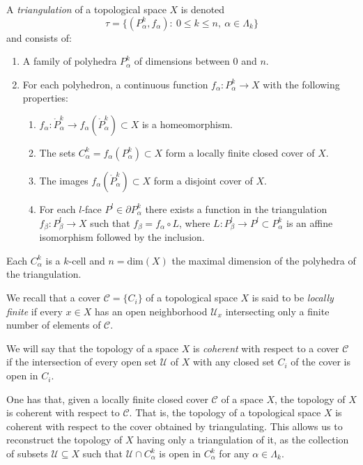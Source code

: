 \begin{definition}
    A \textit{triangulation} of a topological space $X$ is denoted
    \begin{equation*}
        \tau = \{(P^k_{\alpha}, f_{\alpha}): ~0\le k \le n, ~\alpha\in \Lambda_k\}
    \end{equation*}
    and consists of:
    \begin{enumerate}
        \item A family of polyhedra $P^k_{\alpha}$ of dimensions between $0$ and $n$.
        \item For each polyhedron, a continuous function $f_{\alpha}:P^k_{\alpha}\to X$ with the following properties:
        \begin{enumerate}
            \item $f_{\alpha}: \mathring{P}^k_{\alpha}\to f_{\alpha}(\mathring{P}^k_{\alpha})\subset X$ is a homeomorphism.
            \item The sets $C^k_{\alpha}=f_{\alpha}(P^k_{\alpha})\subset X$ form a locally finite closed cover of $X$.
            \item The images $f_{\alpha}(\mathring{P}^k_{\alpha})\subset X$ form a disjoint cover of $X$.
            \item For each $l$-face $P^l\in \partial P^k_{\alpha}$ there exists a function in the triangulation $f_{\beta}:P^l_{\beta}\to X$ such that $f_{\beta} = f_{\alpha}\circ L$, where $L: P^l_{\beta}\to P^l\subset P^k_{\alpha}$ is an affine isomorphism followed by the inclusion.
        \end{enumerate}
    \end{enumerate}
\end{definition}

\bigskip

Each $C^k_{\alpha}$ is a $k$-cell and $n=\text{dim}(X)$ the maximal dimension of the polyhedra of the triangulation.

We recall that a cover $\mathcal{C}=\{C_i\}$ of a topological space $X$ is said to be \textit{locally finite} if every $x\in X$ has an open neighborhood $\mathcal{U}_x$ intersecting only a finite number of elements of $\mathcal{C}$.

We will say that the topology of a space $X$ is \textit{coherent} with respect to a cover $\mathcal{C}$ if the intersection of every open set $\mathcal{U}$ of $X$ with any closed set $C_i$ of the cover is open in $C_i$.

One has that, given a locally finite closed cover $\mathcal{C}$ of a space $X$, the topology of $X$ is coherent with respect to $\mathcal{C}$. That is, the topology of a topological space $X$ is coherent with respect to the cover obtained by triangulating. This allows us to reconstruct the topology of $X$ having only a triangulation of it, as the collection of subsets $\mathcal{U}\subseteq X$ such that $\mathcal{U}\cap C^k_{\alpha}$ is open in $C^k_{\alpha}$ for any $\alpha\in \Lambda_k$.

